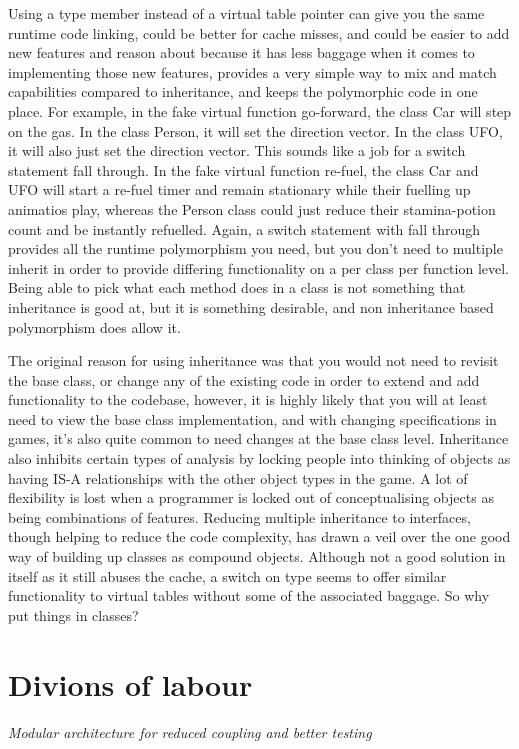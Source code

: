 Using a type member instead of a virtual table pointer can give you the same
runtime code linking,  could be better for cache misses, and could be easier to
add new features and reason about because it has less baggage when it comes to
implementing those new features, provides a very simple way to mix and match
capabilities compared to inheritance, and keeps the polymorphic code in one
place. For example, in the fake virtual function go-forward, the class Car will
step on the gas. In the class Person, it will set the direction vector. In the
class UFO, it will also just set the direction vector. This sounds like a job
for a switch statement fall through. In the fake virtual function re-fuel, the
class Car and UFO will start a re-fuel timer and remain stationary while
their fuelling up animatios play, whereas the Person class could just reduce
their stamina-potion count and be instantly refuelled. Again, a switch
statement with fall through provides all the runtime polymorphism you need,
but you don't need to multiple inherit in order to provide differing
functionality on a per class per function level. Being able to pick what each
method does in a class is not something that inheritance is good at, but it
is something desirable, and non inheritance based polymorphism does allow it.

The original reason for using inheritance was that you would not need to
revisit the base class, or change any of the existing code in order to extend
and add functionality to the codebase, however, it is highly likely that you
will at least need to view the base class implementation, and with changing
specifications in games, it's also quite common to need changes at the base
class level. Inheritance also inhibits certain types of analysis by locking
people into thinking of objects as having IS-A relationships with the other
object types in the game. A lot of flexibility is lost when a programmer is
locked out of conceptualising objects as being combinations of features.
Reducing multiple inheritance to interfaces, though helping to reduce the code
complexity, has drawn a veil over the one good way of building up classes as
compound objects. Although not a good solution in itself as it still abuses the
cache, a switch on type seems to offer similar functionality to virtual tables
without some of the associated baggage. So why put things in classes?

\section{Divions of labour}
\emph{Modular architecture for reduced coupling and
better testing} \\ \hfill

